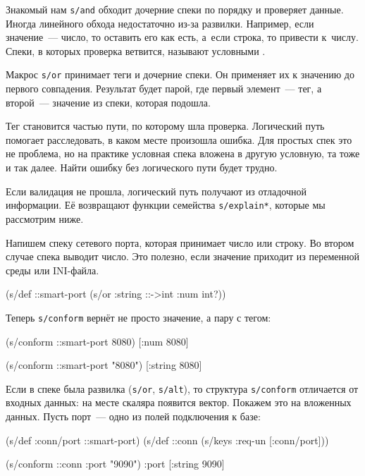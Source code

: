 Знакомый нам \verb|s/and| обходит дочерние спеки по порядку и проверяет
данные. Иногда линейного обхода недостаточно из-за развилки. Например, если
значение~--- число, то оставить его как есть, а~если строка, то привести
к~числу. Спеки, в которых проверка ветвится, называют условными
.

Макрос \verb|s/or| принимает теги и дочерние спеки. Он применяет их к значению
до первого совпадения. Результат будет парой, где первый элемент~--- тег, а
второй~--- значение из спеки, которая подошла.

Тег становится частью пути, по которому шла проверка. Логический путь помогает
расследовать, в каком месте произошла ошибка. Для простых спек это не проблема,
но на практике условная спека вложена в другую условную, та тоже и так
далее. Найти ошибку без логического пути будет трудно.


Если валидация не прошла, логический путь получают из отладочной информации. Её
возвращают функции семейства \verb|s/explain*|, которые мы рассмотрим ниже.

Напишем спеку сетевого порта, которая принимает число или строку. Во втором
случае спека выводит число. Это полезно, если значение приходит из переменной
среды или INI-файла.

\begin{english}
  \begin{clojure}
(s/def ::smart-port
  (s/or :string ::->int :num int?))
  \end{clojure}
\end{english}

\noindent
Теперь \verb|s/conform| вернёт не просто значение, а пару с тегом:

\begin{english}
  \begin{clojure}
(s/conform ::smart-port 8080)
[:num 8080]

(s/conform ::smart-port "8080")
[:string 8080]
  \end{clojure}
\end{english}


Если в спеке была развилка (\verb|s/or|, \verb|s/alt|), то структура
\verb|s/conform| отличается от входных данных: на месте скаляра появится
вектор. Покажем это на вложенных данных. Пусть порт~--- одно из полей
подключения к базе:

\begin{english}
  \begin{clojure}
(s/def :conn/port ::smart-port)
(s/def ::conn
  (s/keys :req-un [:conn/port]))

(s/conform ::conn {:port "9090"})
{:port [:string 9090]}
  \end{clojure}
\end{english}

